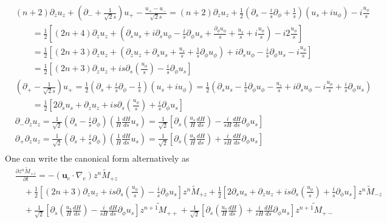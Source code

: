 \[
\begin{aligned}
    &(n+2) \partial_z u_z + \left(\partial_- + \frac{1}{\sqrt{2}s}\right) u_+ - \frac{u_+ - u_-}{\sqrt{2}s} = (n+2) \partial_z u_z + \frac{1}{2}\left(\partial_s - \frac{i}{s}\partial_\phi + \frac{1}{s}\right) \left(u_s + i u_\phi\right) - i \frac{u_\phi}{s} \\ 
    &\qquad = \frac{1}{2} \left[(2n+4) \partial_z u_z + \left(\partial_s u_s + i\partial_s u_\phi - \frac{i}{s}\partial_\phi u_s + \frac{\partial_\phi u_\phi}{s} + \frac{u_s}{s} + i\frac{u_\phi}{s}\right) - i 2 \frac{u_\phi}{s}\right] \\ 
    &\qquad = \frac{1}{2} \left[(2n+3) \partial_z u_z + \left(\partial_z u_z + \partial_s u_s + \frac{u_s}{s} + \frac{1}{s} \partial_\phi u_\phi \right) + i\partial_s u_\phi - \frac{i}{s}\partial_\phi u_s - i \frac{u_\phi}{s}\right] \\ 
    &\qquad = \frac{1}{2} \left[(2n+3) \partial_z u_z + is \partial_s \left(\frac{u_\phi}{s}\right) - \frac{i}{s} \partial_\phi u_s\right] \\ 
    &\left(\partial_+ - \frac{1}{\sqrt{2}s}\right) u_+ = \frac{1}{2}\left(\partial_s + \frac{i}{s}\partial_\phi - \frac{1}{s}\right) \left(u_s + iu_\phi\right) = \frac{1}{2} \left(\partial_s u_s - \frac{1}{s}\partial_\phi u_\phi - \frac{u_s}{s} + i \partial_s u_\phi - i \frac{u_\phi}{s} + \frac{i}{s} \partial_\phi u_s\right) \\ 
    &\qquad = \frac{1}{2} \left[2\partial_s u_s + \partial_z u_z + is \partial_s \left(\frac{u_\phi}{s}\right) + \frac{i}{s} \partial_\phi u_s\right] \\ 
    &\partial_- \partial_z u_z = \frac{1}{\sqrt{2}} \left(\partial_s - \frac{i}{s} \partial_\phi\right) \left(\frac{1}{H}\frac{dH}{ds}u_s\right) = \frac{1}{\sqrt{2}} \left[\partial_s \left(\frac{u_s}{H}\frac{dH}{ds}\right) - \frac{i}{sH}\frac{dH}{ds} \partial_\phi u_s\right] \\ 
    &\partial_+ \partial_z u_z = \frac{1}{\sqrt{2}} \left(\partial_s + \frac{i}{s} \partial_\phi\right) \left(\frac{1}{H}\frac{dH}{ds}u_s\right) = \frac{1}{\sqrt{2}} \left[\partial_s \left(\frac{u_s}{H}\frac{dH}{ds}\right) + \frac{i}{sH}\frac{dH}{ds} \partial_\phi u_s\right] \\ 
\end{aligned}
\]
%
One can write the canonical form alternatively as
%
\[\begin{aligned}
    &\frac{\partial \widetilde{z^n M_{+ z}}}{\partial t} = - \left(\mathbf{u}_e\cdot \nabla_e\right) \widetilde{z^n M_{+z}} \\
    &\quad + \frac{1}{2} \left[(2n+3) \partial_z u_z + is \partial_s \left(\frac{u_\phi}{s}\right) - \frac{i}{s} \partial_\phi u_s\right] \widetilde{z^n M_{+z}} + \frac{1}{2} \left[2\partial_s u_s + \partial_z u_z + is \partial_s \left(\frac{u_\phi}{s}\right) + \frac{i}{s} \partial_\phi u_s\right] \widetilde{z^n M_{-z}} \\
    &\quad + \frac{1}{\sqrt{2}} \left[\partial_s \left(\frac{u_s}{H}\frac{dH}{ds}\right) - \frac{i}{sH}\frac{dH}{ds} \partial_\phi u_s\right] \widetilde{z^{n+1} M_{++}} + \frac{1}{\sqrt{2}} \left[\partial_s \left(\frac{u_s}{H}\frac{dH}{ds}\right) + \frac{i}{sH}\frac{dH}{ds} \partial_\phi u_s\right] \widetilde{z^{n+1} M_{+-}}
\end{aligned}\]
